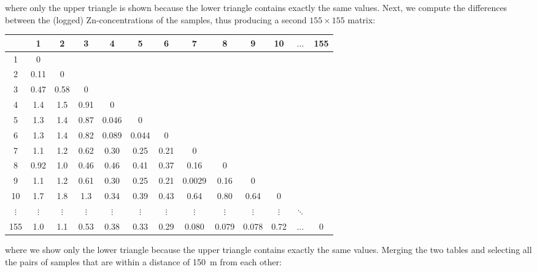 \noindent where only the upper triangle is shown because the lower
triangle contains exactly the same values. Next, we compute the
differences between the (logged) Zn-concentrations of the samples,
thus producing a second $155\times{155}$ matrix:

\begin{center}
\begin{tabular}{c|cccccccccccc}
~ & 1 & 2 & 3 & 4 & 5 & 6 & 7 & 8 & 9 & 10& $\ldots$ & 155\\ \hline
1 & 0 & ~ & ~ & ~ & ~ & ~ & ~ & ~ & ~ & ~ & ~ & ~ \\
2 & 0.11 & 0 & ~ & ~ & ~ & ~ & ~ & ~ & ~ & ~ & ~ & ~ \\
3 & 0.47 & 0.58 & 0 & ~ & ~ & ~ & ~ & ~ & ~ & ~ & ~ & ~ \\
4 & 1.4 & 1.5 & 0.91 & 0 & ~ & ~ & ~ & ~ & ~ & ~ & ~ & ~ \\
5 & 1.3 & 1.4 & 0.87 & 0.046 & 0 & ~ & ~ & ~ & ~ & ~ & ~ & ~ \\
6 & 1.3 & 1.4 & 0.82 & 0.089 & 0.044 & 0 & ~ & ~ & ~ & ~ & ~ & ~ \\
7 & 1.1 & 1.2 & 0.62 & 0.30 & 0.25 & 0.21 & 0 & ~ & ~ & ~ & ~ & ~ \\
8 & 0.92 & 1.0 & 0.46 & 0.46 & 0.41 & 0.37 & 0.16 & 0 & ~ & ~ & ~ & ~ \\
9 & 1.1 & 1.2 & 0.61 & 0.30 & 0.25 & 0.21 & 0.0029 & 0.16 & 0 & ~ & ~ & ~ \\
10& 1.7 & 1.8 & 1.3 & 0.34 & 0.39 & 0.43 & 0.64 & 0.80 & 0.64 & 0 & ~ & ~ \\
$\vdots$ & $\vdots$ & $\vdots$ & $\vdots$ & $\vdots$ & $\vdots$ &
$\vdots$ & $\vdots$ & $\vdots$ & $\vdots$ & $\vdots$ & $\ddots$ & ~ \\
155 & 1.0 & 1.1 & 0.53 & 0.38 & 0.33 & 0.29 & 0.080 & 0.079 & 0.078 & 0.72 & $\ldots$ & 0\\
\end{tabular}
\end{center}

\noindent where we show only the lower triangle because the upper
triangle contains exactly the same values. Merging the two tables and
selecting all the pairs of samples that are within a distance of 150~m
from each other:

